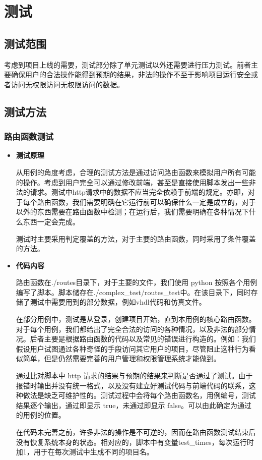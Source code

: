 \section{测试}
    \setlength\parskip{0.3\baselineskip}
    \subsection{测试范围}
    考虑到项目上线的需要，测试部分除了单元测试以外还需要进行压力测试。前者主要确保用户的合法操作能得到预期的结果，非法的操作不至于影响项目运行安全或者访问无权限访问无权限访问的数据。
    \subsection{测试方法}
        \subsubsection{路由函数测试}
            \begin{itemize}
            \item \textbf{测试原理}
            
            \quad \quad 从用例的角度考虑，合理的测试方法是通过访问路由函数来模拟用户所有可能的操作。考虑到用户完全可以通过修改前端，甚至是直接使用脚本发出一些非法的请求。测试中http请求中的数据不应当完全依赖于前端的规定。亦即，对于每个路由函数，我们需要明确在它运行前可以确保什么一定是成立的，对于以外的东西需要在路由函数中检测；在运行后，我们需要明确在各种情况下什么东西一定会完成。

            \quad \quad 测试时主要采用判定覆盖的方法，对于主要的路由函数，同时采用了条件覆盖的方法。
        
            \item \textbf{代码内容}
            
            \quad \quad 路由函数在./routes目录下，对于主要的文件，我们使用 python 按照各个用例编写了脚本。脚本储存在./complex\_test/routes\_test中。在该目录下，同时存储了测试中需要用到的部分数据，例如vhdl代码和仿真文件。
            
            \quad \quad 在部分用例中，测试是从登录，创建项目开始，直到本用例的核心路由函数。对于每个用例，我们都给出了完全合法的访问的各种情况，以及非法的部分情况。后者主要是根据路由函数的代码以及常见的错误进行构造的。例如：我们假设用户试图通过各种奇怪的手段访问其它用户的项目，尽管阻止这种行为看似简单，但是仍然需要完善的用户管理和权限管理系统才能做到。
            
            \quad \quad 通过比对脚本中 http 请求的结果与预期的结果来判断是否通过了测试。由于报错时输出并没有统一格式，以及没有建立好测试代码与前端代码的联系，这种做法是缺乏可维护性的。测试过程中会将每个路由函数名，用例编号，测试结果逐个输出，通过即显示 true，未通过即显示 false。可以由此确定为通过的用例的位置。
            
            \quad \quad 在代码未完善之前，许多非法的操作是不可逆的，因而在路由函数测试结束后没有恢复系统本身的状态。相对应的，脚本中有变量test\_times，每次运行时加1，用于在每次测试中生成不同的项目名。
            
            \end{itemize}
